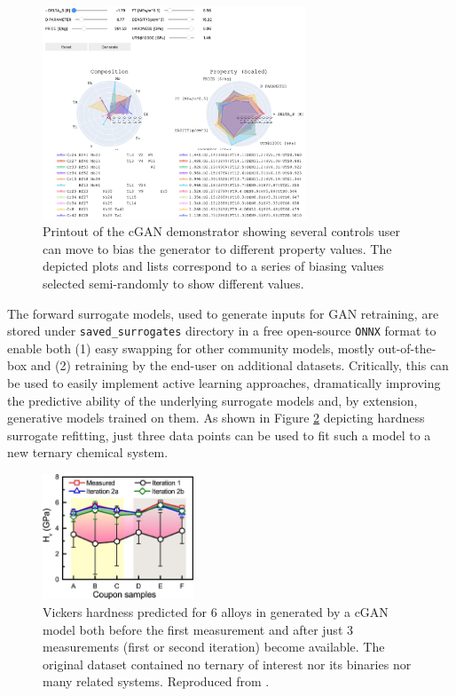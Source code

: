 \begin{figure}[H]
    \centering
    \includegraphics[width=0.7\textwidth]{inversedesign/cgan_demo.png}
    \caption{Printout of the cGAN demonstrator showing several controls user can move to bias the generator to different property values. The depicted plots and lists correspond to a series of biasing values selected semi-randomly to show different values.}
    \label{inverse:fig:cgandemo}
\end{figure}

The forward surrogate models, used to generate inputs for GAN retraining, are stored under \texttt{saved\_surrogates} directory in a free open-source \texttt{ONNX} format to enable both (1) easy swapping for other community models, mostly out-of-the-box and (2) retraining by the end-user on additional datasets. Critically, this can be used to easily implement active learning approaches, dramatically improving the predictive ability of the underlying surrogate models and, by extension, generative models trained on them. As shown in Figure \ref{inverse:fig:activelearn} depicting hardness surrogate refitting, just three data points can be used to fit such a model to a new ternary chemical system.

\begin{figure}[H]
    \centering
    \includegraphics[width=0.4\textwidth]{inversedesign/inverse_active.jpg}
    \caption{Vickers hardness predicted for 6  alloys in \cite{Li2024DesignExperiments} generated by a cGAN model both before the first measurement and after just 3 measurements (first or second iteration) become available. The original dataset contained no ternary of interest nor its binaries nor many related systems. Reproduced from \cite{Li2024DesignExperiments}.}
    \label{inverse:fig:activelearn}
\end{figure}








